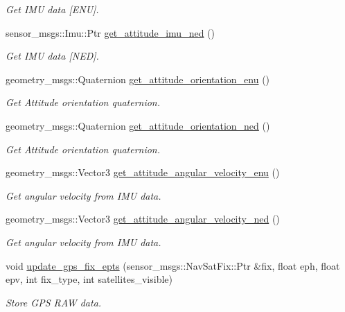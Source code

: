 \begin{DoxyCompactItemize}
\begin{DoxyCompactList}\small\item\em Get I\+MU data \mbox{[}E\+NU\mbox{]}. \end{DoxyCompactList}\item 
sensor\+\_\+msgs\+::\+Imu\+::\+Ptr \mbox{\hyperlink{group__nodelib_ga31440655ed2c55b927fb6e3ed66a41a1}{get\+\_\+attitude\+\_\+imu\+\_\+ned}} ()
\begin{DoxyCompactList}\small\item\em Get I\+MU data \mbox{[}N\+ED\mbox{]}. \end{DoxyCompactList}\item 
geometry\+\_\+msgs\+::\+Quaternion \mbox{\hyperlink{group__nodelib_gada6bb75eadc7ce6ad379c5e3a24625b0}{get\+\_\+attitude\+\_\+orientation\+\_\+enu}} ()
\begin{DoxyCompactList}\small\item\em Get Attitude orientation quaternion. \end{DoxyCompactList}\item 
geometry\+\_\+msgs\+::\+Quaternion \mbox{\hyperlink{group__nodelib_ga7524149188b866dfd044b2d6e03eb328}{get\+\_\+attitude\+\_\+orientation\+\_\+ned}} ()
\begin{DoxyCompactList}\small\item\em Get Attitude orientation quaternion. \end{DoxyCompactList}\item 
geometry\+\_\+msgs\+::\+Vector3 \mbox{\hyperlink{group__nodelib_ga2386d8414c90fcd1d19832656eed1742}{get\+\_\+attitude\+\_\+angular\+\_\+velocity\+\_\+enu}} ()
\begin{DoxyCompactList}\small\item\em Get angular velocity from I\+MU data. \end{DoxyCompactList}\item 
geometry\+\_\+msgs\+::\+Vector3 \mbox{\hyperlink{group__nodelib_gad8c9d0e754109b465ee25115ef55860e}{get\+\_\+attitude\+\_\+angular\+\_\+velocity\+\_\+ned}} ()
\begin{DoxyCompactList}\small\item\em Get angular velocity from I\+MU data. \end{DoxyCompactList}\item 
void \mbox{\hyperlink{group__nodelib_ga5230fcf5827b4a682efe35b91a66152b}{update\+\_\+gps\+\_\+fix\+\_\+epts}} (sensor\+\_\+msgs\+::\+Nav\+Sat\+Fix\+::\+Ptr \&fix, float eph, float epv, int fix\+\_\+type, int satellites\+\_\+visible)
\begin{DoxyCompactList}\small\item\em Store G\+PS R\+AW data. \end{DoxyCompactList}\item 

\end{DoxyCompactItemize}
